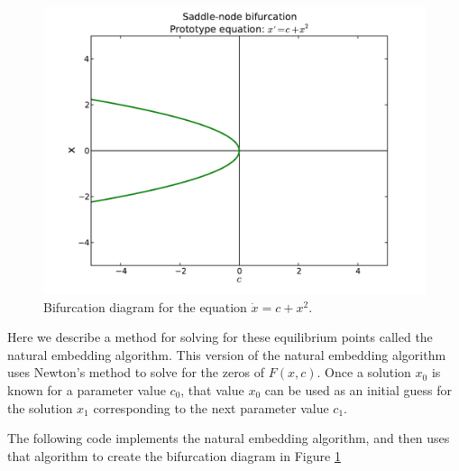 \begin{figure}[ht]
\centering
\includegraphics[width=\textwidth]{SaddleNBifurcation.pdf}
\caption{Bifurcation diagram for the equation $\dot{x} = c + x^2$.}
\label{bifurcation:sn}
\end{figure}

Here we describe a method for solving for these equilibrium points called the natural embedding algorithm. This version of the natural embedding algorithm uses Newton's method to solve for the zeros of $F(x,c).$ Once a solution $x_0$ is known for a parameter value $c_0$, that value $x_0$ can be used as an initial guess for the solution $x_1$ corresponding to the next parameter value $c_1$.

The following code implements the natural embedding algorithm, and then uses that algorithm to create the bifurcation diagram in Figure \ref{bifurcation:sn}

